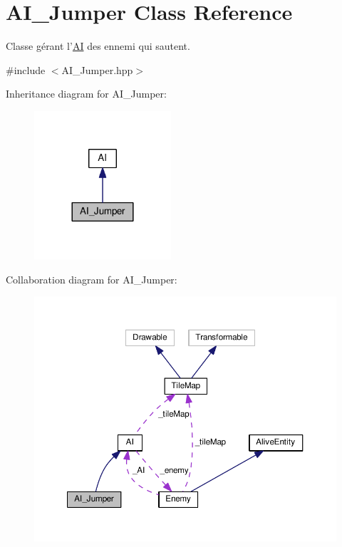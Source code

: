 \hypertarget{class_a_i___jumper}{\section{A\+I\+\_\+\+Jumper Class Reference}
\label{class_a_i___jumper}
}


Classe gérant l'\hyperlink{class_a_i}{A\+I} des ennemi qui sautent.  




{\ttfamily \#include $<$A\+I\+\_\+\+Jumper.\+hpp$>$}



Inheritance diagram for A\+I\+\_\+\+Jumper\+:
\nopagebreak
\begin{figure}[H]
\begin{center}
\leavevmode
\includegraphics[width=144pt]{class_a_i___jumper__inherit__graph}
\end{center}
\end{figure}


Collaboration diagram for A\+I\+\_\+\+Jumper\+:
\nopagebreak
\begin{figure}[H]
\begin{center}
\leavevmode
\includegraphics[width=350pt]{class_a_i___jumper__coll__graph}
\end{center}
\end{figure}

